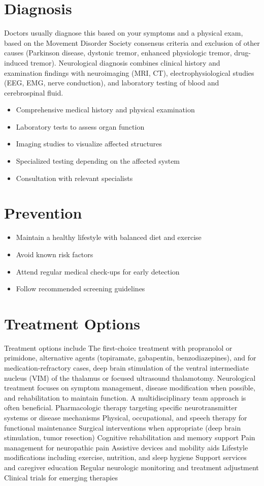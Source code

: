 \section{Diagnosis}
Doctors usually diagnose this based on your symptoms and a physical exam, based on the Movement Disorder Society consensus criteria and exclusion of other causes (Parkinson disease, dystonic tremor, enhanced physiologic tremor, drug-induced tremor). Neurological diagnosis combines clinical history and examination findings with neuroimaging (MRI, CT), electrophysiological studies (EEG, EMG, nerve conduction), and laboratory testing of blood and cerebrospinal fluid.

\begin{itemize}[noitemsep]
  \item Comprehensive medical history and physical examination
  \item Laboratory tests to assess organ function
  \item Imaging studies to visualize affected structures
  \item Specialized testing depending on the affected system
  \item Consultation with relevant specialists
\end{itemize}
\section{Prevention}
\begin{itemize}[noitemsep]
  \item Maintain a healthy lifestyle with balanced diet and exercise
  \item Avoid known risk factors
  \item Attend regular medical check-ups for early detection
  \item Follow recommended screening guidelines
\end{itemize}
\section{Treatment Options}
Treatment options include The first-choice treatment with propranolol or primidone, alternative agents (topiramate, gabapentin, benzodiazepines), and for medication-refractory cases, deep brain stimulation of the ventral intermediate nucleus (VIM) of the thalamus or focused ultrasound thalamotomy. Neurological treatment focuses on symptom management, disease modification when possible, and rehabilitation to maintain function. A multidisciplinary team approach is often beneficial. Pharmacologic therapy targeting specific neurotransmitter systems or disease mechanisms Physical, occupational, and speech therapy for functional maintenance Surgical interventions when appropriate (deep brain stimulation, tumor resection) Cognitive rehabilitation and memory support Pain management for neuropathic pain Assistive devices and mobility aids Lifestyle modifications including exercise, nutrition, and sleep hygiene Support services and caregiver education Regular neurologic monitoring and treatment adjustment Clinical trials for emerging therapies

